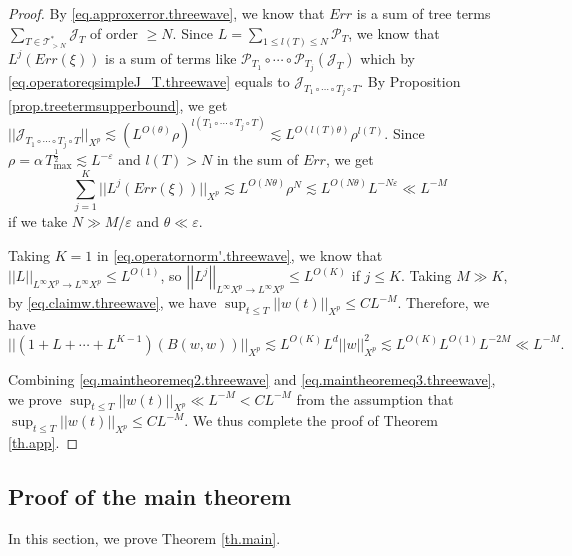 \begin{proof}
By \eqref{eq.approxerror.threewave}, we know that $Err$ is a sum of tree terms $\sum_{T\in \mathcal{T}_{>N}^*} \mathcal{J}_T$ of order $\ge N$. Since $L=\sum_{1\le l(T)\le N} \mathcal{P}_{T}$, we know that $L^j(Err(\xi))$ is a sum of terms like $\mathcal{P}_{T_1}\circ\cdots\circ\mathcal{P}_{T_{j}}(\mathcal{J}_T)$ which by \eqref{eq.operatoreqsimpleJ_T.threewave} equals to $\mathcal{J}_{T_1\circ\cdots\circ T_{j}\circ T}$. By Proposition \ref{prop.treetermsupperbound}, we get $||\mathcal{J}_{T_1\circ\cdots\circ T_{j}\circ T}||_{X^p}\lesssim (L^{O(\theta)} \rho)^{l(T_1\circ\cdots\circ T_{j}\circ T)}\lesssim L^{O(l(T)\theta)} \rho^{l(T)}$. Since $\rho=\alpha\, T^{\frac{1}{2}}_{\text{max}}\lesssim L^{-\varepsilon}$ and $l(T)>N$ in the sum of $Err$, we get 
\begin{equation}\label{eq.maintheoremeq2.threewave}
    \sum_{j=1}^K||L^j(Err(\xi))||_{X^p}\lesssim L^{O(N\theta)} \rho^{N}\lesssim L^{O(N\theta)} L^{-N\varepsilon}\ll L^{-M}
\end{equation}
if we take $N\gg M/\varepsilon$ and $\theta\ll \varepsilon$.

Taking $K=1$ in \eqref{eq.operatornorm'.threewave}, we know that $\left|\left|L\right|\right|_{L^{\infty}X^p\rightarrow L^{\infty}X^p}\le L^{O(1)}$, so $\left|\left|L^j\right|\right|_{L^{\infty}X^p\rightarrow L^{\infty}X^p}\le L^{O(K)}$ if $j\le K$. Taking $M\gg K$, by \eqref{eq.claimw.threewave}, we have $\sup _{t\le T}||w(t)||_{X^p}\le CL^{-M}$. Therefore, we have 
\begin{equation}\label{eq.maintheoremeq3.threewave}
    ||(1+L+\cdots+L^{K-1})(B(w,w))||_{X^p}\lesssim L^{O(K)} L^d ||w||^2_{X^p}\lesssim L^{O(K)} L^{O(1)} L^{-2M}\ll L^{-M}.
\end{equation}

Combining \eqref{eq.maintheoremeq2.threewave} and \eqref{eq.maintheoremeq3.threewave}, we prove $\sup _{t\le T}||w(t)||_{X^p}\ll L^{-M} < CL^{-M}$ from the assumption that $\sup _{t\le T}||w(t)||_{X^p}\le CL^{-M}$. We thus complete the proof of Theorem \ref{th.app}.
\end{proof}


\subsection{Proof of the main theorem}\label{sec.proofmain} In this section, we prove Theorem \ref{th.main}.

